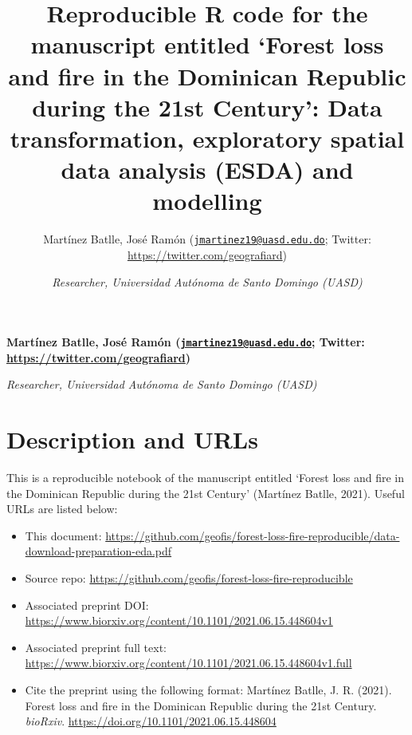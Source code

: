 \documentclass[10pt,landscape,a3paper]{article}
\title{Reproducible R code for the manuscript entitled `Forest loss and
fire in the Dominican Republic during the 21st Century': Data
transformation, exploratory spatial data analysis (ESDA) and
modelling  }
\author{\Large Martínez Batlle, José Ramón
(\href{mailto:jmartinez19@uasd.edu.do}{\nolinkurl{jmartinez19@uasd.edu.do}};
Twitter:
\url{https://twitter.com/geografiard})\vspace{0.05in} \newline\normalsize\emph{}   \and \Large \vspace{0.05in} \newline\normalsize\emph{Researcher,
Universidad Autónoma de Santo Domingo (UASD)}  }
\date{}
\newcommand*{\authorfont}{\fontfamily{phv}\selectfont}
\begin{document}
	
%    


{%
\setlength{\parindent}{0pt}
\thispagestyle{plain}
{\fontsize{18}{20}\selectfont\raggedright 
\maketitle  %

}

{
   \vskip 13.5pt\relax \normalsize\fontsize{11}{12} 
\textbf{\authorfont Martínez Batlle, José Ramón
(\href{mailto:jmartinez19@uasd.edu.do}{\nolinkurl{jmartinez19@uasd.edu.do}};
Twitter:
\url{https://twitter.com/geografiard})} \hskip 15pt \emph{\small }   \par \textbf{\authorfont } \hskip 15pt \emph{\small Researcher,
Universidad Autónoma de Santo Domingo (UASD)}   

}

}






\vskip 6.5pt

{
\hypersetup{linkcolor=black}
\setcounter{tocdepth}{4}
\tableofcontents
}

\noindent  \hypertarget{description-and-urls}{%
\section{Description and URLs}\label{description-and-urls}}

This is a reproducible notebook of the manuscript entitled `Forest loss
and fire in the Dominican Republic during the 21st Century' (Martínez
Batlle, 2021). Useful URLs are listed below:

\begin{itemize}
\item
  This document:
  \url{https://github.com/geofis/forest-loss-fire-reproducible/data-download-preparation-eda.pdf}
\item
  Source repo:
  \url{https://github.com/geofis/forest-loss-fire-reproducible}
\item
  Associated preprint DOI:
  \url{https://www.biorxiv.org/content/10.1101/2021.06.15.448604v1}
\item
  Associated preprint full text:
  \url{https://www.biorxiv.org/content/10.1101/2021.06.15.448604v1.full}
\item
  Cite the preprint using the following format: Martínez Batlle, J. R.
  (2021). Forest loss and fire in the Dominican Republic during the 21st
  Century. \emph{bioRxiv}.
  \url{https://doi.org/10.1101/2021.06.15.448604}
\end{itemize}
\end{document}
